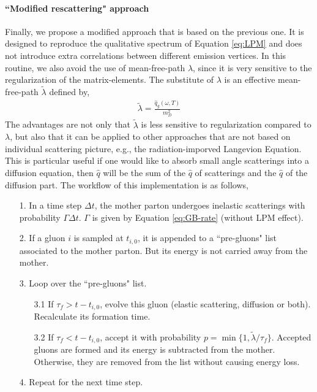 \documentclass[aps, prc, reprint, amsmath, groupedaddress, nofootinbib]{revtex4-1}
\begin{document}
\paragraph*{``Modified rescattering" approach} Finally, we propose a modified approach that is based on the previous one.
It is designed to reproduce the qualitative spectrum of Equation \ref{eq:LPM} and does not introduce extra correlations between different emission vertices. 
In this routine, we also avoid the use of mean-free-path $\lambda$, since it is very sensitive to the regularization of the matrix-elements. 
The substitute of $\lambda$ is an effective mean-free-path $\tilde{\lambda}$ defined by,
\begin{eqnarray}
\tilde{\lambda} = \frac{\hat{q}_g(\omega, T)}{m_D^2}
\end{eqnarray}
The advantages are not only that $\tilde{\lambda}$ is less sensitive to regularization compared to $\lambda$, but also that it can be applied to other approaches that are not based on individual scattering picture, e.g., the radiation-imporved Langevion Equation.
This is particular useful if one would like to absorb small angle scatterings into a diffusion equation, then $\hat{q}$ will be the sum of the $\hat{q}$ of scatterings and the $\hat{q}$ of the diffusion part.
The workflow of this implementation is as follows,
\begin{itemize}
\item[1.] In a time step $\Delta t$, the mother parton undergoes inelastic scatterings with probability $\Gamma\Delta t$. $\Gamma$ is given by Equation \ref{eq:GB-rate} (without LPM effect).
\item[2.] If a gluon $i$ is sampled at $t_{i,0}$, it is appended to a ``pre-gluons" list associated to the mother parton. But its energy is not carried away from the mother.
\item[3.] Loop over the ``pre-gluons" list. 
\begin{itemize}
\item[3.1] If $\tau_f > t-t_{i,0}$, evolve this gluon (elastic scattering, diffusion or both). Recalculate its formation time.
\item[3.2] If $\tau_f < t-t_{i,0}$, accept it with probability $p = \min\{1, \tilde{\lambda}/\tau_f\}$. Accepted gluons are formed and its energy is subtracted from the mother. Otherwise, they are removed from the list without causing energy loss.
\end{itemize} 
\item[4.] Repeat for the next time step.
\end{itemize}
\end{document}
